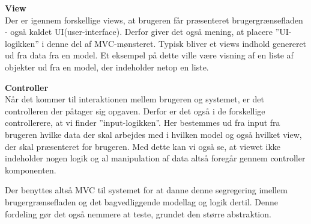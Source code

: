 \textbf{View}\\
Der er igennem forskellige views, at brugeren får præsenteret brugergrænsefladen - også kaldet UI(user-interface).
Derfor giver det også mening, at placere ''UI-logikken'' i denne del af MVC-mønsteret.
Typisk bliver et views indhold genereret ud fra data fra en model.
Et eksempel på dette ville være visning af en liste af objekter ud fra en model, der indeholder netop en liste.

\textbf{Controller}\\
Når det kommer til interaktionen mellem brugeren og systemet, er det controlleren der påtager sig opgaven.
Derfor er det også i de forskellige controllerere, at vi finder ''input-logikken''. Her bestemmes ud fra input fra brugeren hvilke data der skal arbejdes med i hvilken model og også hvilket view, der skal præsenteret for brugeren. Med dette kan vi også se, at viewet ikke indeholder nogen logik og al manipulation af data altså foregår gennem controller komponenten.


Der benyttes altså MVC til systemet for at danne denne segregering imellem brugergrænsefladen og det bagvedliggende modellag og logik dertil.
Denne fordeling gør det også nemmere at teste, grundet den større abstraktion.
